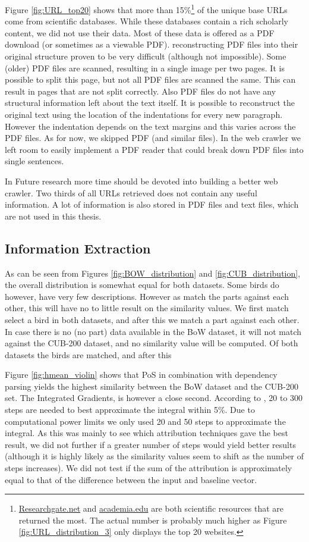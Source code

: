 \documentclass[a4paper, 12pt, oneside]{book} %
\begin{document}
Figure \ref{fig:URL_top20} shows that more than 15\%\footnote{\href{https://www.researchgate.net/}{Researchgate.net} and \href{https://www.academia.edu/}{academia.edu} are both scientific resources that are returned the most. The actual number is probably much higher as Figure \ref{fig:URL_distribution_3} only displays the top 20 websites.} of the unique base URLs come from scientific databases.
While these databases contain a rich scholarly content, we did not use their data.
Most of these data is offered as a PDF download (or sometimes as a viewable PDF).
reconstructing PDF files into their original structure proven to be very difficult (although not impossible).
Some (older) PDF files are scanned, resulting in a single image per two pages. 
It is possible to split this page, but not all PDF files are scanned the same. 
This can result in pages that are not split correctly.
Also PDF files do not have any structural information left about the text itself. 
It is possible to reconstruct the original text using the location of the indentations for every new paragraph.
However the indentation depends on the text margins and this varies across the PDF files.
As for now, we skipped PDF (and similar files). 
In the web crawler we left room to easily implement a PDF reader that could break down PDF files into single sentences.

In Future research more time should be devoted into building a better web crawler.
Two thirds of all URLs retrieved does not contain any useful information.
A lot of information is also stored in PDF files and text files, which are not used in this thesis.

\subsection{Information Extraction}
As can be seen from Figures \ref{fig:BOW_distribution} and \ref{fig:CUB_distribution}, the overall distribution is somewhat equal for both datasets.
Some birds do however, have very few descriptions. 
However as match the parts against each other, this will have no to little result on the similarity values.
We first match select a bird in both datasets, and after this we match a part against each other.
In case there is no (no part) data available in the BoW dataset, it will not match against the CUB-200 dataset, and no similarity value will be computed.
Of both datasets the birds are matched, and after this 

Figure \ref{fig:hmean_violin} shows that PoS in combination with dependency parsing yields the highest similarity between the BoW dataset and the CUB-200 set.
The Integrated Gradients, is however a close second. 
According to \textcite{sundararajan_axiomatic_2017}, 20 to 300 steps are needed to best approximate the integral within 5\%.
Due to computational power limits we only used 20 and 50 steps to approximate the integral.
As this was mainly to see which attribution techniques gave the best result, we did not further if a greater number of steps would yield better results (although it is highly likely as the similarity values seem to shift as the number of steps increases).
We did not test if the sum of the attribution is approximately equal to that of the difference between the input and baseline vector.
\end{document}
